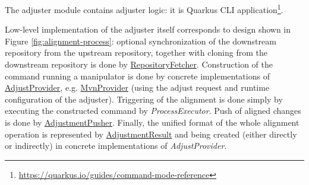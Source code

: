 \documentclass[../main.tex]{subfiles}
\begin{document}
The adjuster module contains adjuster logic: it is Quarkus CLI application\footnote{\url{https://quarkus.io/guides/command-mode-reference}}.

Low-level implementation of the adjuster itself corresponds to design shown in Figure \ref{fig:alignment-process}: optional synchronization of the downstream repository from the upstream repository, together with cloning from the downstream repository is done by \href{https://github.com/project-ncl/reqour/blob/akridl-thesis/adjuster/src/main/java/org/jboss/pnc/reqour/adjust/service/RepositoryFetcher.java}{RepositoryFetcher}. Construction of the command running a manipulator is done by concrete implementations of \href{https://github.com/project-ncl/reqour/blob/akridl-thesis/adjuster/src/main/java/org/jboss/pnc/reqour/adjust/provider/AdjustProvider.java}{AdjustProvider}, e.g. \href{https://github.com/project-ncl/reqour/blob/akridl-thesis/adjuster/src/main/java/org/jboss/pnc/reqour/adjust/provider/MvnProvider.java##L102}{MvnProvider} (using the adjust request and runtime configuration of the adjuster). Triggering of the alignment is done simply by executing the constructed command by \textit{ProcessExecutor}. Push of aligned changes is done by \href{https://github.com/project-ncl/reqour/blob/akridl-thesis/adjuster/src/main/java/org/jboss/pnc/reqour/adjust/service/AdjustmentPusher.java}{AdjustmentPusher}. Finally, the unified format of the whole alignment operation is represented by \href{https://github.com/project-ncl/reqour/blob/akridl-thesis/adjuster/src/main/java/org/jboss/pnc/reqour/adjust/model/AdjustmentResult.java}{AdjustmentResult} and being created (either directly or indirectly) in concrete implementations of \textit{AdjustProvider}.
\end{document}
